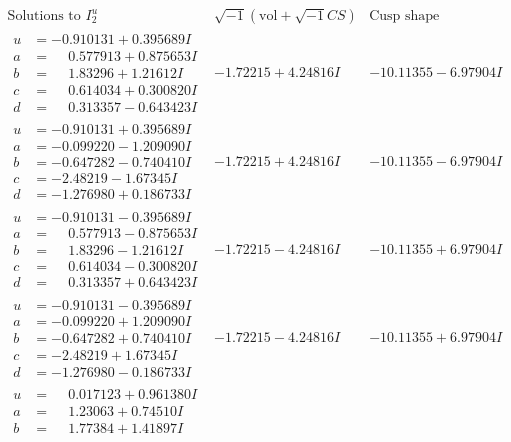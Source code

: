 \documentclass[1p]{elsarticle_modified}
\theoremstyle{definition}
\newcommand{\I}{\sqrt{-1}}
\begin{document}
$$\begin{array}{c|c|c}  
\text{Solutions to }I^u_{2}& \I (\text{vol} + \sqrt{-1}CS) & \text{Cusp shape}\\
 \hline 
\begin{aligned}
u &= -0.910131 + 0.395689 I \\
a &= \phantom{-}0.577913 + 0.875653 I \\
b &= \phantom{-}1.83296 + 1.21612 I \\
c &= \phantom{-}0.614034 + 0.300820 I \\
d &= \phantom{-}0.313357 - 0.643423 I\end{aligned}
 & -1.72215 + 4.24816 I & -10.11355 - 6.97904 I \\ \hline\begin{aligned}
u &= -0.910131 + 0.395689 I \\
a &= -0.099220 - 1.209090 I \\
b &= -0.647282 - 0.740410 I \\
c &= -2.48219 - 1.67345 I \\
d &= -1.276980 + 0.186733 I\end{aligned}
 & -1.72215 + 4.24816 I & -10.11355 - 6.97904 I \\ \hline\begin{aligned}
u &= -0.910131 - 0.395689 I \\
a &= \phantom{-}0.577913 - 0.875653 I \\
b &= \phantom{-}1.83296 - 1.21612 I \\
c &= \phantom{-}0.614034 - 0.300820 I \\
d &= \phantom{-}0.313357 + 0.643423 I\end{aligned}
 & -1.72215 - 4.24816 I & -10.11355 + 6.97904 I \\ \hline\begin{aligned}
u &= -0.910131 - 0.395689 I \\
a &= -0.099220 + 1.209090 I \\
b &= -0.647282 + 0.740410 I \\
c &= -2.48219 + 1.67345 I \\
d &= -1.276980 - 0.186733 I\end{aligned}
 & -1.72215 - 4.24816 I & -10.11355 + 6.97904 I \\ \hline\begin{aligned}
u &= \phantom{-}0.017123 + 0.961380 I \\
a &= \phantom{-}1.23063 + 0.74510 I \\
b &= \phantom{-}1.77384 + 1.41897 I \\

\end{aligned}
\end{array}$$
\end{document}
